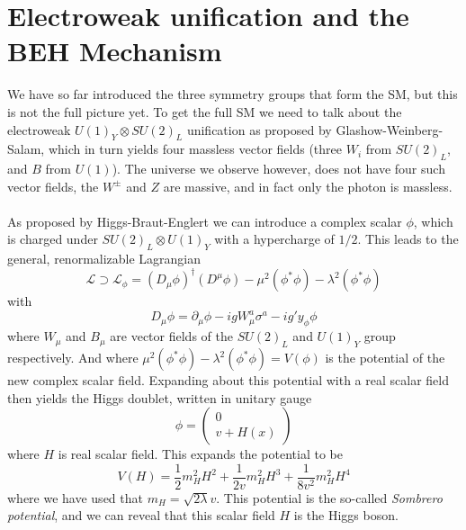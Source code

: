 \documentclass[12pt, a4paper]{book}
\begin{document}
\section{Electroweak unification and the BEH Mechanism}\label{sec:EW}
We have so far introduced the three symmetry groups that form the SM, but this is not the full picture yet. To get the full SM we need to talk about the electroweak $U(1)_Y\otimes SU(2)_L$ unification as proposed by Glashow-Weinberg-Salam, 
which in turn yields four massless vector fields (three $W_i$ from $SU(2)_L$, and $B$ from $U(1)$). The universe we observe however, does not have four such vector fields, the $W^\pm$ and $Z$ are massive, and in fact only the photon is 
massless.\\
\\As proposed by Higgs-Braut-Englert we can introduce a complex scalar $\phi$, which is charged under $SU(2)_L\otimes U(1)_Y$ with a hypercharge of $1/2$. This leads to the general, renormalizable Lagrangian 
\begin{equation}\label{eq:electroweak}
    \mathcal{L}\supset \mathcal{L}_\phi = \left(D_\mu \phi\right)^\dagger\left(D^\mu \phi\right) -\mu^2\left(\phi^*\phi\right) - \lambda^2\left(\phi^*\phi\right)%
\end{equation}
with 
\begin{equation}\label{eq:covar_higgs}
    D_\mu \phi =\partial_\mu \phi -igW_\mu^a\sigma^a-ig'y_\phi \phi
\end{equation}
where $W_\mu$ and $B_\mu$ are vector fields of the $SU(2)_L$ and $U(1)_Y$ group respectively. And where $\mu^2\left(\phi^*\phi\right) - \lambda^2\left(\phi^*\phi\right)= V(\phi)$ is the potential of the new complex scalar field. Expanding about this
potential with a real scalar field then yields the Higgs doublet, written in unitary gauge 
\begin{equation}\label{eq:Higgs}
    \phi = \begin{pmatrix}
        0\\v+H(x)
    \end{pmatrix}
\end{equation}
where $H$ is real scalar field. This expands the potential to be
\begin{equation}\label{eq:sombrero}
    V(H) =\frac{1}{2}m_H^2H^2 + \frac{1}{2v}m_H^2H^3 +\frac{1}{8v^2}m_H^2H^4
\end{equation}
where we have used that $m_H = \sqrt{2\lambda}v$. This potential is the so-called \textit{Sombrero potential}, and we can reveal that this scalar field $H$ is the Higgs boson. 
\end{document}
